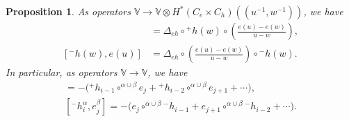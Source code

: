 \documentclass[10pt]{amsart}
\newcommand{\BV}{\mathbb{V}}
\newcommand{\+}{{}^+}
\newtheorem {proposition}[theorem]{Proposition}
\theoremstyle{definition}
\theoremstyle {definition}
\theoremstyle {definition}
\begin{document}
\begin{proposition}\label{prop: [e,m]}
As operators $\BV\rightarrow \BV\otimes H^*(C_e\times C_h)(\!(u^{-1},w^{-1})\!)$, we have
\begin{align*}
    [{}^{+}h(w), e(u)]&=\Delta_{eh}\circ {}^{+}h(w)\circ\left(\frac{e(u)-e(w)}{u-w}
\right),\\
    [{}^{-}h(w), e(u)]&=\Delta_{eh}\circ \left(\frac{e(u)-e(w)}{u-w}\right)\circ {}^{-}h(w).
\end{align*}
In particular, as operators $\BV\rightarrow \BV$, we have 
\begin{align*}
    [\+h_i^\alpha,e^\beta_j]=-\big(\+h_{i-1}\circ^{\alpha\cup\beta}e_{j}+\+h_{i-2}\circ^{\alpha\cup\beta}e_{j+1}+\cdots\big),\\
    [{}^{-}h_i^\alpha,e^\beta_j]=-\big(e_{j}\circ^{\alpha\cup\beta}{}^{-}h_{i-1}   +e_{j+1}\circ^{\alpha\cup\beta}{}^{-}h_{i-2}+\cdots\big).
\end{align*}
\end{proposition}
\end{document}
